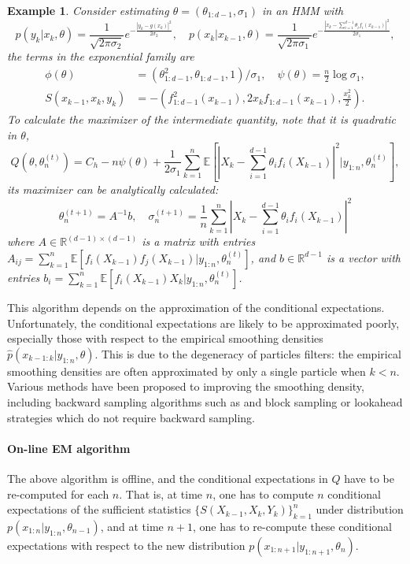 \documentclass[12pt]{article}
\def\R{\mathbb{R}}
\newcommand{\Ebr}[1]{\mathbb{E}\left[{#1}\right]}
\newtheorem{example}[theorem]{Example}
\numberwithin{equation}{section}
\numberwithin{theorem}{section}
\begin{document}
 \begin{example} 
 Consider estimating $\theta =(\theta_{1:d-1},\sigma_1) $ in an HMM with
 \[p(y_k|x_k,\theta) = \frac{1}{\sqrt{2\pi \sigma_2}}e^{-\frac{|y_k-g(x_k)|^2}{2\sigma_2} },\quad 
 p(x_{k}|x_{k-1},\theta) = \frac{1}{\sqrt{2\pi \sigma_1}}e^{-\frac{|x_k- \sum_{i=1}^{d-1} \theta_{i} f_i(x_{k-1})|^2}{2\sigma_1} }, \]
the terms in the exponential family are
\begin{align*}
\phi(\theta) &= (\theta^2_{1:d-1},\theta_{1:d-1}, 1)/\sigma_1,  \quad \psi(\theta)  = \frac{n}{2}\log \sigma_1,  \\ 
S(x_{k-1},x_k, y_k)&= - \left(f_{1:d-1}^2(x_{k-1}), 2x_kf_{1:d-1}(x_{k-1}), \frac{x_k^2}{2} \right). 
\end{align*}
To calculate the maximizer of the intermediate quantity, note that it is quadratic in $\theta$,
\[
Q(\theta,\theta^{(t)}_n)=C_h-n\psi(\theta)+\frac{1}{2\sigma_1} \sum_{k=1}^n\Ebr{|X_k -\sum_{i=1}^{d-1} \theta_{i} f_i(X_{k-1})|^2 \bigg |y_{1:n},\theta^{(t)}_n},
\] 
 its maximizer can be analytically calculated:
\[
\theta^{(t+1)}_n = A^{-1}b, \quad \sigma^{(t+1)}_n= \frac{1}{n} \sum_{k=1}^n |X_k- \sum_{i=1}^{d-1} \theta_{i} f_i(X_{k-1})|^2
 \]  
where $A\in \R^{(d-1)\times (d-1)}$ is a matrix with entries $A_{ij} = \sum_{k=1}^n\Ebr{ f_i(X_{k-1})f_j(X_{k-1})|y_{1:n},\theta^{(t)}_n}$, and $b\in \R^{d-1}$ is a vector with entries $b_i =  \sum_{k=1}^n\Ebr{ f_i(X_{k-1})X_k|y_{1:n},\theta^{(t)}_n}$.
\end{example}

This algorithm depends on the approximation of the conditional expectations. Unfortunately, the conditional expectations are likely to be approximated poorly, especially those with respect to the empirical smoothing densities  $\hat p(x_{k-1:k}|y_{1:n},\theta)$. This is due to the degeneracy of particles filters: the empirical smoothing densities are often approximated by only a single particle when $k< n$.  Various methods have been proposed to improving the smoothing density, including backward sampling algorithms such as \cite{XX} and block sampling \cite{DBS} or lookahead strategies \cite{Liu et al} which do not require backward sampling. 


\paragraph{On-line EM algorithm}

The above algorithm is offline, and the conditional expectations in $Q$ have to be re-computed for each $n$. That is, at time $n$, one has to compute $n$ conditional expectations of the sufficient statistics $\{S(X_{k-1},X_k,Y_k)\}_{k=1}^n$ under distribution $p(x_{1:n}|y_{1:n},\theta_{n-1})$, and at time $n+1$, one has to re-compute these conditional expectations with respect to the new distribution $p(x_{1:n+1}|y_{1:n+1},\theta_{n})$.
\end{document}
